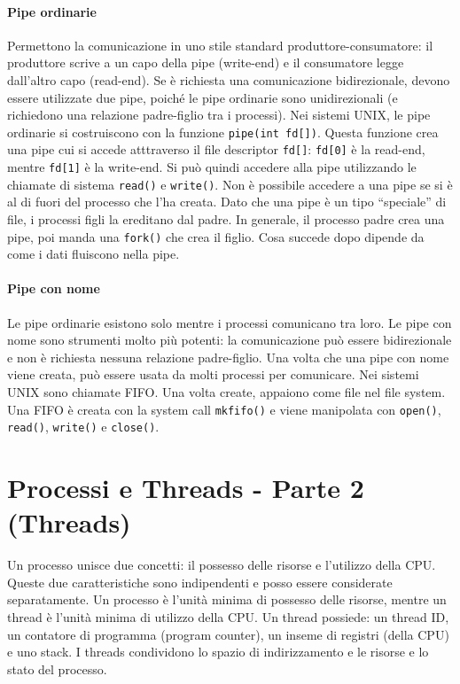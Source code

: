 \documentclass[a4]{article}
\begin{document}
\paragraph{Pipe ordinarie} Permettono la comunicazione in uno stile standard produttore-consumatore: il produttore scrive a un capo della pipe (write-end) e il consumatore legge dall'altro capo (read-end). Se è richiesta una comunicazione bidirezionale, devono essere utilizzate due pipe, poiché le pipe ordinarie sono unidirezionali (e richiedono una relazione padre-figlio tra i processi). \newline
Nei sistemi UNIX, le pipe ordinarie si costruiscono con la funzione \texttt{pipe(int fd[])}. Questa funzione crea una pipe cui si accede atttraverso il file descriptor \texttt{fd[]}: \texttt{fd[0]} è la read-end, mentre \texttt{fd[1]} è la write-end. Si può quindi accedere alla pipe utilizzando le chiamate di sistema \texttt{read()} e \texttt{write()}. Non è possibile accedere a una pipe se si è al di fuori del processo che l'ha creata. Dato che una pipe è un tipo ``speciale'' di file, i processi figli la ereditano dal padre. In generale, il processo padre crea una pipe, poi manda una \texttt{fork()} che crea il figlio. Cosa succede dopo dipende da come i dati fluiscono nella pipe.

\paragraph{Pipe con nome} Le pipe ordinarie esistono solo mentre i processi comunicano tra loro. Le pipe con nome sono strumenti molto più potenti: la comunicazione può essere bidirezionale e non è richiesta nessuna relazione padre-figlio. Una volta che una pipe con nome viene creata, può essere usata da molti processi per comunicare. Nei sistemi UNIX sono chiamate FIFO. Una volta create, appaiono come file nel file system. Una FIFO è creata con la system call \texttt{mkfifo()} e viene manipolata con \texttt{open()}, \texttt{read()}, \texttt{write()} e \texttt{close()}.


\section{Processi e Threads - Parte 2 (Threads)}

Un processo unisce due concetti: il possesso delle risorse e l'utilizzo della CPU. Queste due caratteristiche sono indipendenti e posso essere considerate separatamente. \newline
Un processo è l'unità minima di possesso delle risorse, mentre un thread è l'unità minima di utilizzo della CPU. Un thread possiede: un thread ID, un contatore di programma (program counter), un inseme di registri (della CPU) e uno stack. I threads condividono lo spazio di indirizzamento e le risorse e lo stato del processo.
\end{document}
